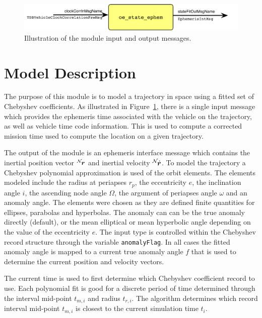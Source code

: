 

\begin{figure}[h]
	\centerline{
		\includegraphics{Figures/moduleImg}
	}
	\caption{Illustration of the module input and output messages.}
	\label{fig:moduleImg}
\end{figure}


\section{Model Description}
The purpose of this module is to model a trajectory in space using a fitted set of Chebyshev coefficients.  As illustrated in Figure~\ref{fig:moduleImg}, there is a single input message which provides the ephemeris time associated with the vehicle on the trajectory, as well as vehicle time code information.  This is used to compute a corrected mission time used to compute the location on a given trajectory.

The output of the module is an ephemeris interface message which contains the inertial position vector $\leftexp{N}{\bm r}$ and inertial velocity $\leftexp{N}{\dot{\bm r}}$.  To model the trajectory  a Chebyshev polynomial approximation is used of the orbit elements.  The elements modeled include the radius at periapses $r_{p}$, the eccentricity $e$, the inclination angle $i$, the ascending node angle $\Omega$, the argument of periapses angle $\omega$ and an anomaly angle. The elements were chosen as they are defined finite quantities for ellipses, parabolas and hyperbolas.  The anomaly can can be the true anomaly directly (default), or the mean elliptical or mean hyperbolic angle depending on the value of the eccentricity $e$.  The input type is controlled within the Chebyshev record structure through the variable {\tt anomalyFlag}.  In all cases the fitted anomaly angle is mapped to a current true anomaly angle $f$ that is used to determine the current position and velocity vectors. 

The current time is used to first determine which Chebyshev coefficient record to use.  Each polynomial fit is good for a discrete period of time determined through the interval mid-point $t_{m,i}$ and radius $t_{r,i}$.   The algorithm determines which record interval mid-point $t_{m,i}$ is closest to the current simulation time $t_{i}$.  

